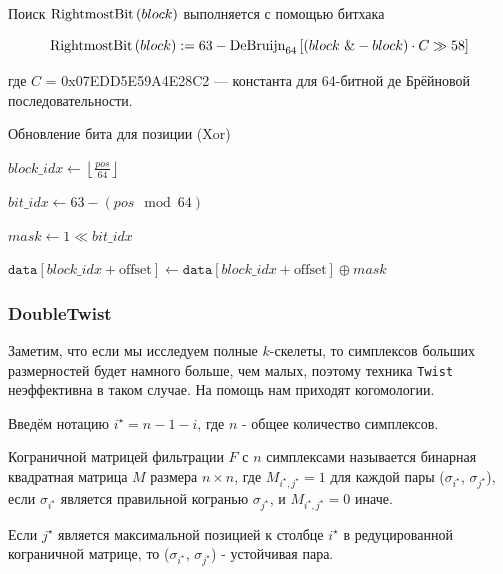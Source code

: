 \documentclass{article}
\begin{document}
Поиск $\mathop{\rm RightmostBit}{(block)}$ выполняется с помощью битхака \autocite{bithacks}

\[\mathop{\rm RightmostBit}{(block)} := 63 - \text{DeBruijn}_{64}\left[ (block \ \& -block) \cdot C \gg 58 \right]\]

где $C$ = 0x07EDD5E59A4E28C2 — константа для 64-битной де Брёйновой последовательности.

\begin{algorithm}[H]
\caption{Обновление бита для позиции (Xor)}
$block\_idx \gets \left\lfloor \frac{pos}{64} \right\rfloor$

$bit\_idx \gets 63 - (pos \mod 64)$

$mask \gets 1 \ll bit\_idx$

$\texttt{data}[block\_idx + \text{offset}] \gets \texttt{data}[block\_idx + \text{offset}] \oplus mask$

\end{algorithm}

\subsubsection{DoubleTwist}
Заметим, что если мы исследуем полные $k$-скелеты, то симплексов больших размерностей будет намного больше, чем малых, поэтому техника \texttt{Twist} неэффективна в таком случае. На помощь нам приходят когомологии.

Введём нотацию $i^\star = n - 1 - i$, где $n$ - общее количество симплексов.
\begin{definition}
  Кограничной матрицей фильтрации $F$ с $n$ симплексами называется бинарная квадратная матрица $M$ размера $n\times n$, где $M_{i^\star,j^\star}=1$ для каждой пары ($\sigma_{i^\star}$, $\sigma_{j^\star}$), если $\sigma_{i^\star}$ является правильной когранью $\sigma_{j^\star}$, и $M_{i^\star,j^\star}=0$ иначе.
\end{definition}

\begin{lemma}
  Если $j^\star$ является максимальной позицией к столбце $i^\star$ в редуцированной кограничной матрице, то  ($\sigma_{i^\star}$, $\sigma_{j^\star}$) - устойчивая пара.  
\end{lemma}
\end{document}
